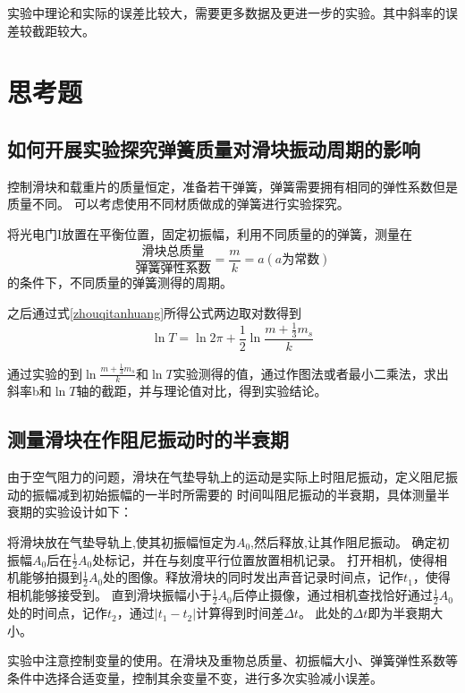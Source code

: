 \documentclass{ctexart}
\begin{document}
  实验中理论和实际的误差比较大，需要更多数据及更进一步的实验。其中斜率的误差较截距较大。
\newpage

\section{思考题}
  \subsection{如何开展实验探究弹簧质量对滑块振动周期的影响}
  控制滑块和载重片的质量恒定，准备若干弹簧，弹簧需要拥有相同的弹性系数但是质量不同。
  可以考虑使用不同材质做成的弹簧进行实验探究。

  将光电门I放置在平衡位置，固定初振幅，利用不同质量的的弹簧，测量在
  \begin{equation}
    \frac{\mbox{滑块总质量}}{\mbox{弹簧弹性系数}}=\frac{m}{k}=a \left(a\mbox{为常数}\right)
  \end{equation}
  的条件下，不同质量的弹簧测得的周期。
  
  之后通过式\ref{zhouqitanhuang}所得公式两边取对数得到
  \begin{equation}
    \ln T=\ln 2\pi + \frac{1}{2} \ln \frac{m+\frac{1}{3}m_{s}}{k}
  \end{equation}
  
  通过实验的到$\ln \frac{m+\frac{1}{3}m_{s}}{k}$和$\ln T$实验测得的值，通过作图法或者最小二乘法，求出
  斜率b和$\ln T$轴的截距，并与理论值对比，得到实验结论。
  \subsection{测量滑块在作阻尼振动时的半衰期}

  由于空气阻力的问题，滑块在气垫导轨上的运动是实际上时阻尼振动，定义阻尼振动的振幅减到初始振幅的一半时所需要的
  时间叫阻尼振动的半衰期，具体测量半衰期的实验设计如下：

  将滑块放在气垫导轨上,使其初振幅恒定为$A_{0}$,然后释放,让其作阻尼振动。
  确定初振幅$A_{0}$后在$\frac{1}{2} A_{0}$处标记，并在与刻度平行位置放置相机记录。
  打开相机，使得相机能够拍摄到$\frac{1}{2} A_{0}$处的图像。释放滑块的同时发出声音记录时间点，记作$t_{1}$，使得相机能够接受到。
  直到滑块振幅小于$\frac{1}{2} A_{0}$后停止摄像，通过相机查找恰好通过$\frac{1}{2} A_{0}$处的时间点，记作$t_{2}$，通过$|t_{1}-t_{2}|$计算得到时间差$\Delta t$。
  此处的$\Delta t$即为半衰期大小。

  实验中注意控制变量的使用。在滑块及重物总质量、初振幅大小、弹簧弹性系数等条件中选择合适变量，控制其余变量不变，进行多次实验减小误差。
\newpage
\end{document}
